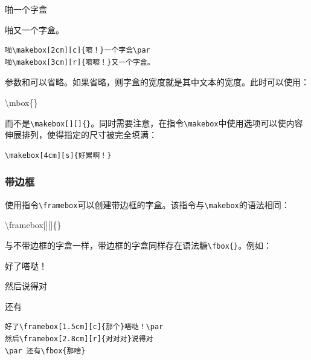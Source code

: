 \begin{codelist}[4.8]{
  啪一个字盒\par
啪又一个字盒。
}
\begin{verbatim}
啪\makebox[2cm][c]{嚓！}一个字盒\par
啪\makebox[3cm][r]{嚓嚓！}又一个字盒。\end{verbatim}
\end{codelist}

参数和可以省略。如果省略，则字盒的宽度就是其中文本的宽度。此时可以使用：

\begin{dmd}
\backslash mbox\{\}
\end{dmd}

而不是\verb|\makebox[][]{|\verb|}|。同时需要注意，在指令\verb|\makebox|中使用选项可以使内容伸展排列，使得指定的尺寸被完全填满：

\begin{codelist}[4.9]{
}
\begin{verbatim}
\makebox[4cm][s]{好累啊！}\end{verbatim}
\end{codelist}

\subsubsection{带边框}

使用指令\verb|\framebox|可以创建带边框的字盒。该指令与\verb|\makebox|的语法相同：

\begin{dmd}
  \backslash framebox[][]\{\}
\end{dmd}

与不带边框的字盒一样，带边框的字盒同样存在语法糖\verb|\fbox{|\verb|}|。例如：

\begin{codelist}[4.10]{
  好了嗒哒！\par
  然后说得对
  \par 还有
}
\begin{verbatim}
好了\framebox[1.5cm][c]{那个}嗒哒！\par
然后\framebox[2.8cm][r]{对对对}说得对
\par 还有\fbox{那啥}\end{verbatim}
\end{codelist}

